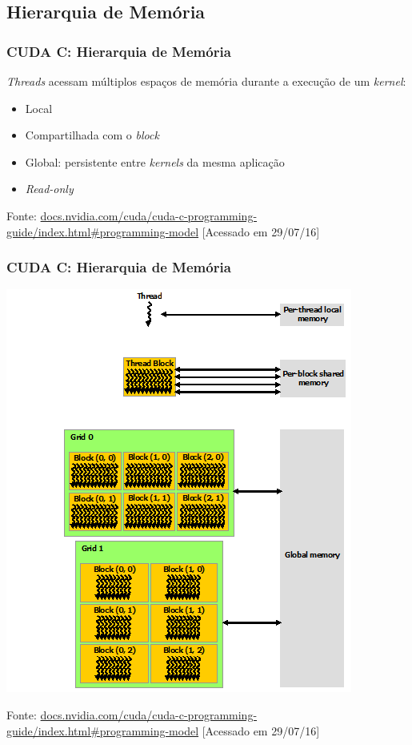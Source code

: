 \documentclass[10pt, compress]{beamer}
\begin{document}
\subsection{Hierarquia de Memória}

\begin{frame}
    \frametitle{CUDA C: Hierarquia de Memória}
    \textit{Threads} acessam \alert{múltiplos espaços de memória} durante a execução de
    um \textit{kernel}:
    \begin{itemize}
        \item Local
            \pause
        \item Compartilhada com o \textit{block}
            \pause
        \item Global\pause: persistente entre \textit{kernels} da \alert{mesma aplicação}
            \pause
        \item \textit{Read-only}
    \end{itemize}
    \vfill

    \begin{center}
        \tiny{Fonte: \url{docs.nvidia.com/cuda/cuda-c-programming-guide/index.html\#programming-model} [Acessado em 29/07/16]}
    \end{center}
\end{frame}

\begin{frame}
    \frametitle{CUDA C: Hierarquia de Memória}
    \begin{center}
        \includegraphics[width=.5\textwidth]{cuda-memory-hierarchy}
    \end{center}

    \vfill

    \begin{center}
        \tiny{Fonte: \url{docs.nvidia.com/cuda/cuda-c-programming-guide/index.html\#programming-model} [Acessado em 29/07/16]}
    \end{center}
\end{frame}
\end{document}
